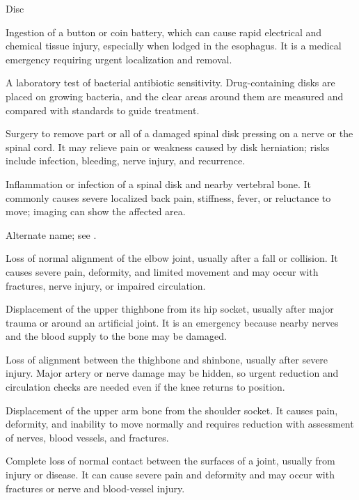 \synonyms
Disc

 Ingestion of a button or coin battery, which can cause rapid electrical and chemical tissue injury, especially when lodged in the esophagus. It is a medical emergency requiring urgent localization and removal.

 A laboratory test of bacterial antibiotic sensitivity. Drug-containing disks are placed on growing bacteria, and the clear areas around them are measured and compared with standards to guide treatment.

 Surgery to remove part or all of a damaged spinal disk pressing on a nerve or the spinal cord. It may relieve pain or weakness caused by disk herniation; risks include infection, bleeding, nerve injury, and recurrence.

 Inflammation or infection of a spinal disk and nearby vertebral bone. It commonly causes severe localized back pain, stiffness, fever, or reluctance to move; imaging can show the affected area.

 Alternate name; see .

 Loss of normal alignment of the elbow joint, usually after a fall or collision. It causes severe pain, deformity, and limited movement and may occur with fractures, nerve injury, or impaired circulation.

 Displacement of the upper thighbone from its hip socket, usually after major trauma or around an artificial joint. It is an emergency because nearby nerves and the blood supply to the bone may be damaged.

 Loss of alignment between the thighbone and shinbone, usually after severe injury. Major artery or nerve damage may be hidden, so urgent reduction and circulation checks are needed even if the knee returns to position.

 Displacement of the upper arm bone from the shoulder socket. It causes pain, deformity, and inability to move normally and requires reduction with assessment of nerves, blood vessels, and fractures.

 Complete loss of normal contact between the surfaces of a joint, usually from injury or disease. It can cause severe pain and deformity and may occur with fractures or nerve and blood-vessel injury.

